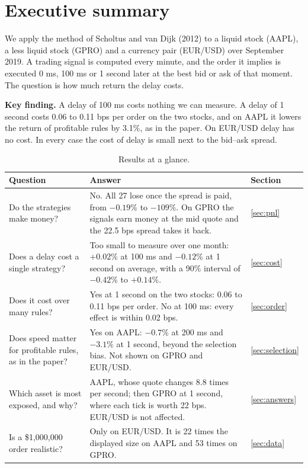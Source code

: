 \documentclass[11pt]{article}
\newcommand{\keyfinding}[1]{%
  \begingroup\setlength{\fboxsep}{9pt}%
  \noindent\colorbox{boxbg}{\parbox{\dimexpr\linewidth-2\fboxsep\relax}{\textbf{\color{accent}Key finding.} #1}}%
  \endgroup\par\vspace{0.5em}}
\begin{document}
\section{Executive summary}
\label{sec:summary}

We apply the method of Scholtus and van Dijk (2012) to a liquid stock (AAPL), a
less liquid stock (GPRO) and a currency pair (EUR/USD) over September 2019. A
trading signal is computed every minute, and the order it implies is executed
0 ms, 100 ms or 1 second later at the best bid or ask of that moment. The question
is how much return the delay costs.

\keyfinding{A delay of 100 ms costs nothing we can measure. A delay of 1 second
costs 0.06 to 0.11 bps per order on the two stocks, and on AAPL it lowers the
return of profitable rules by 3.1\%, as in the paper. On EUR/USD delay has no
cost. In every case the cost of delay is small next to the bid--ask spread.}

\begin{table}[H]
  \centering
  \small
  \caption{Results at a glance.}
  \label{tab:glance}
  \begin{tabular}{@{}L{0.29\textwidth}L{0.52\textwidth}L{0.10\textwidth}@{}}
    \toprule
    Question & Answer & Section \\
    \midrule
    Do the strategies make money? &
      No. All 27 lose once the spread is paid, from $-0.19\%$ to $-109\%$. On GPRO
      the signals earn money at the mid quote and the 22.5 bps spread takes it
      back. & \ref{sec:pnl} \\
    \addlinespace
    Does a delay cost a single strategy? &
      Too small to measure over one month: $+0.02\%$ at 100 ms and $-0.12\%$ at
      1 second on average, with a 90\% interval of $-0.42\%$ to $+0.14\%$. &
      \ref{sec:cost} \\
    \addlinespace
    Does it cost over many rules? &
      Yes at 1 second on the two stocks: 0.06 to 0.11 bps per order. No at
      100 ms: every effect is within 0.02 bps. & \ref{sec:order} \\
    \addlinespace
    Does speed matter for profitable rules, as in the paper? &
      Yes on AAPL: $-0.7\%$ at 200 ms and $-3.1\%$ at 1 second, beyond the
      selection bias. Not shown on GPRO and EUR/USD. & \ref{sec:selection} \\
    \addlinespace
    Which asset is most exposed, and why? &
      AAPL, whose quote changes 8.8 times per second; then GPRO at 1 second, where
      each tick is worth 22 bps. EUR/USD is not affected. & \ref{sec:answers} \\
    \addlinespace
    Is a \$1{,}000{,}000 order realistic? &
      Only on EUR/USD. It is 22 times the displayed size on AAPL and 53 times on
      GPRO. & \ref{sec:data} \\
    \bottomrule
  \end{tabular}
\end{table}
\end{document}
